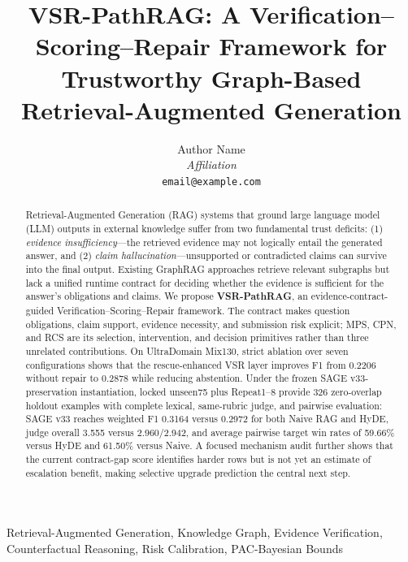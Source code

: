 \documentclass[journal,onecolumn,11pt]{IEEEtran}
\begin{document}
\title{VSR-PathRAG: A Verification--Scoring--Repair Framework for Trustworthy Graph-Based Retrieval-Augmented Generation}

\author{
  Author Name \\
  \textit{Affiliation} \\
  \texttt{email@example.com}
}

\maketitle

\begin{abstract}
Retrieval-Augmented Generation (RAG) systems that ground large language model (LLM) outputs in external knowledge suffer from two fundamental trust deficits: (1) \textit{evidence insufficiency}---the retrieved evidence may not logically entail the generated answer, and (2) \textit{claim hallucination}---unsupported or contradicted claims can survive into the final output. Existing GraphRAG approaches retrieve relevant subgraphs but lack a unified runtime contract for deciding whether the evidence is sufficient for the answer's obligations and claims. We propose \textbf{VSR-PathRAG}, an evidence-contract-guided Verification--Scoring--Repair framework. The contract makes question obligations, claim support, evidence necessity, and submission risk explicit; MPS, CPN, and RCS are its selection, intervention, and decision primitives rather than three unrelated contributions. On UltraDomain Mix130, strict ablation over seven configurations shows that the rescue-enhanced VSR layer improves F1 from 0.2206 without repair to 0.2878 while reducing abstention. Under the frozen SAGE v33-preservation instantiation, locked unseen75 plus Repeat1--8 provide 326 zero-overlap holdout examples with complete lexical, same-rubric judge, and pairwise evaluation: SAGE v33 reaches weighted F1 0.3164 versus 0.2972 for both Naive RAG and HyDE, judge overall 3.555 versus 2.960/2.942, and average pairwise target win rates of 59.66\% versus HyDE and 61.50\% versus Naive. A focused mechanism audit further shows that the current contract-gap score identifies harder rows but is not yet an estimate of escalation benefit, making selective upgrade prediction the central next step.
\end{abstract}

\begin{IEEEkeywords}
Retrieval-Augmented Generation, Knowledge Graph, Evidence Verification, Counterfactual Reasoning, Risk Calibration, PAC-Bayesian Bounds
\end{IEEEkeywords}
\end{document}
